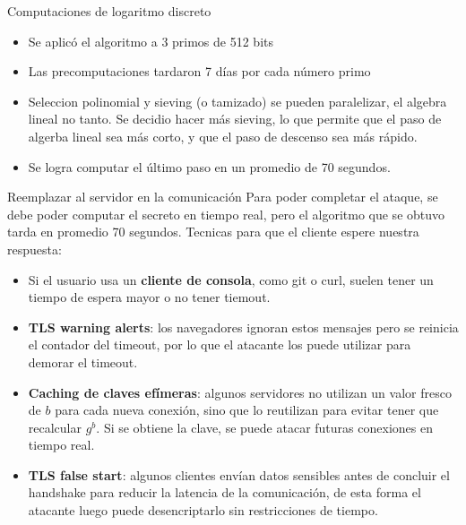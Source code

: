 \documentclass{beamer}
\begin{document}
\begin{frame}{Computaciones de logaritmo discreto}
    \begin{itemize}
        \item Se aplicó el algoritmo a 3 primos de 512 bits %
        \item Las precomputaciones tardaron 7 días por cada número primo
        \item Seleccion polinomial y sieving (o tamizado) se pueden paralelizar, el algebra lineal no tanto. Se decidio hacer más sieving, lo que permite que el paso de algerba lineal sea más corto, y que el paso de descenso sea más rápido.
        \item Se logra computar el último paso en un promedio de 70 segundos.
    \end{itemize}
\end{frame}

\begin{frame}{Reemplazar al servidor en la comunicación}
    Para poder completar el ataque, se debe poder computar el secreto en tiempo real, pero el algoritmo que se obtuvo tarda en promedio 70 segundos. Tecnicas para que el cliente espere nuestra respuesta:

    \begin{itemize}
        \item Si el usuario usa un \textbf{cliente de consola}, como git o curl, suelen tener un tiempo de espera mayor o no tener tiemout.
        \item \textbf{TLS warning alerts}: los navegadores ignoran estos mensajes pero se reinicia el contador del timeout, por lo que el atacante los puede utilizar para demorar el timeout.
        \item \textbf{Caching de claves efímeras}: algunos servidores no utilizan un valor fresco de $b$ para cada nueva conexión, sino que lo reutilizan para evitar tener que recalcular $g^b$. Si se obtiene la clave, se puede atacar futuras conexiones en tiempo real.
        \item \textbf{TLS false start}: algunos clientes envían datos sensibles antes de concluir el handshake para reducir la latencia de la comunicación, de esta forma el atacante luego puede desencriptarlo sin restricciones de tiempo.
    \end{itemize}
\end{frame}
\end{document}
